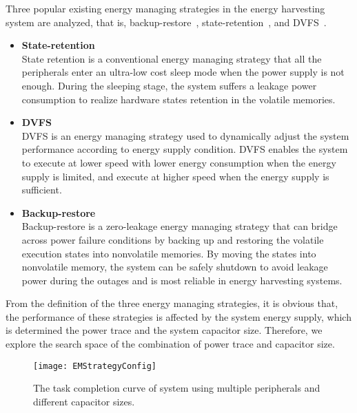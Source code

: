 Three popular existing energy managing strategies in the energy harvesting system are analyzed, that is, backup-restore~\cite{Ma2015Architecture}, state-retention~\cite{wang2017a130nm}, and DVFS~\cite{fletcher2017powerDVFS}.
\begin{itemize}

\item \textbf{State-retention}\\ 
State retention is a conventional energy managing strategy that all the peripherals enter an ultra-low cost sleep mode when the power supply is not enough.
During the sleeping stage, the system suffers a leakage power consumption to realize hardware states retention in the volatile memories.

\item \textbf{DVFS}\\ 
DVFS is an energy managing strategy used to dynamically adjust the system performance according to energy supply condition.
DVFS enables the system to execute at lower speed with lower energy consumption when the energy supply is limited, and execute at higher speed when the energy supply is sufficient.

\item \textbf{Backup-restore}\\ 
Backup-restore is a zero-leakage energy managing strategy that can bridge across power failure conditions by backing up and restoring the volatile execution states into nonvolatile memories. 
By moving the states into nonvolatile memory, the system can be safely shutdown to avoid leakage power during the outages and is most reliable in energy harvesting systems.

\end{itemize}

From the definition of the three energy managing strategies, it is obvious that, the performance of these strategies is affected by the system energy supply, which is determined the power trace and the system capacitor size.
Therefore, we explore the search space of the combination of power trace and capacitor size.

\begin{figure}[!htpb]
	\centering
	\vspace{-0pt}
	\texttt{[image: EMStrategyConfig]}
	\vspace{-15pt}
	\caption{The task completion curve of system using multiple peripherals and different capacitor sizes.}	\label{fig:EMStrategyConfig}
\end{figure}

